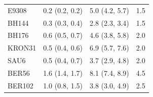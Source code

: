 \documentclass[referee]{aa}
\begin{document}
\begin{appendix}
\begin{table}
\begin{tabular}{llll}
  E9308         & 0.2 (0.2, 0.2) &  5.0 (4.2, 5.7) &  1.5\\
  BH144         & 0.3 (0.3, 0.4) &  2.8 (2.3, 3.4) &  1.5\\
  BH176         & 0.6 (0.5, 0.7) &  4.6 (3.8, 5.8) &  2.0\\
  KRON31        & 0.5 (0.4, 0.6) &  6.9 (5.7, 7.6) &  2.0\\
  SAU6          & 0.5 (0.4, 0.7) &  3.7 (2.9, 4.8) &  2.0\\
  BER56         & 1.6 (1.4, 1.7) &  8.1 (7.4, 8.9) &  4.5\\
  BER102        & 1.0 (0.8, 1.5) &  3.8 (3.0, 4.9) &  2.5\\

\end{tabular}
\end{table}
\end{appendix}
\end{document}
